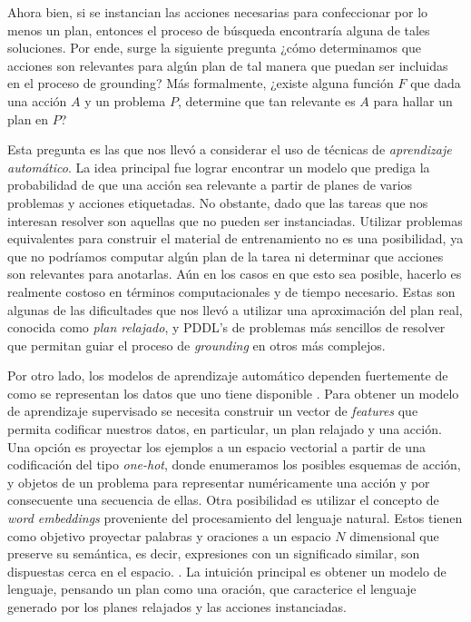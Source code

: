 Ahora bien, si se instancian las acciones necesarias para confeccionar por lo
menos un plan, entonces el proceso de búsqueda encontraría alguna de tales
soluciones. Por ende, surge la siguiente pregunta ¿cómo determinamos que
acciones son relevantes para algún plan de tal manera que puedan ser incluidas
en el proceso de grounding? Más formalmente, ¿existe alguna función $F$
que dada una acción $A$ y un problema $P$, determine que tan relevante es $A$
para hallar un plan en $P$?

Esta pregunta es las que nos llevó a considerar el uso de técnicas de
\emph{aprendizaje automático}. La idea principal fue lograr encontrar un modelo
que prediga la probabilidad de que una acción sea relevante a partir de planes
de varios problemas y acciones etiquetadas. No obstante, dado que las tareas que
nos interesan resolver son aquellas que no pueden ser instanciadas. Utilizar
problemas equivalentes para construir el material de entrenamiento no es una
posibilidad, ya que no podríamos computar algún plan de la tarea ni determinar
que acciones son relevantes para anotarlas. Aún en los casos en que esto sea
posible, hacerlo es realmente costoso en términos computacionales y de tiempo
necesario. Estas son algunas de las dificultades que nos llevó a utilizar una
aproximación del plan real, conocida como \emph{plan relajado}, y PDDL's de
problemas más sencillos de resolver que permitan guiar el proceso de
\emph{grounding} en otros más complejos.

Por otro lado, los modelos de aprendizaje automático dependen fuertemente de
como se representan los datos que uno tiene disponible \citep{Heaton-2016-AnEA}.
Para obtener un modelo de aprendizaje supervisado se necesita construir un
vector de \emph{features} que permita codificar nuestros datos, en particular,
un plan relajado y una acción. Una opción es proyectar los ejemplos a un espacio
vectorial a partir de una codificación del tipo \emph{one-hot}, donde enumeramos
los posibles esquemas de acción, y objetos de un problema para representar
numéricamente una acción y por consecuente una secuencia de ellas. Otra
posibilidad es utilizar el concepto de \emph{word embeddings} proveniente del
procesamiento del lenguaje natural. Estos tienen como objetivo proyectar
palabras y oraciones a un espacio $N$ dimensional que preserve su semántica, es
decir, expresiones con un significado similar, son dispuestas cerca en el
espacio. \citep{Mikolov-Ilya-Kai-Greg-Jeffrey-2013,
Pennington-Jeffrey-Socher-Richard-Manning-Christopher-2014,
Bojanowski-Grave-Joulin-Mikolov-2016}. La intuición principal es obtener un
modelo de lenguaje, pensando un plan como una oración, que caracterice el
lenguaje generado por los planes relajados y las acciones instanciadas. 

